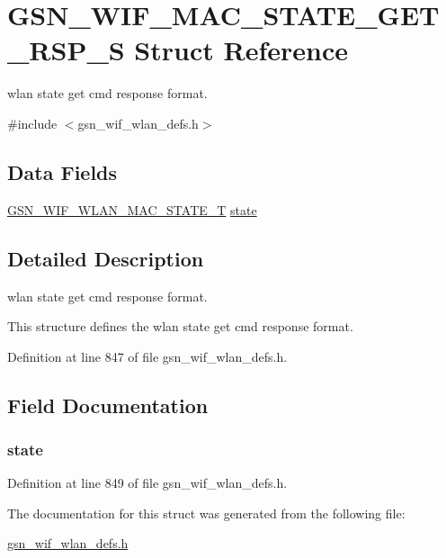 \hypertarget{a00341}{
\section{GSN\_\-WIF\_\-MAC\_\-STATE\_\-GET\_\-RSP\_\-S Struct Reference}
\label{a00341}
}


wlan state get cmd response format.  




{\ttfamily \#include $<$gsn\_\-wif\_\-wlan\_\-defs.h$>$}

\subsection*{Data Fields}
\begin{DoxyCompactItemize}
\item 
\hyperlink{a00677_gabb160daeefaad3c313cfd17480013311}{GSN\_\-WIF\_\-WLAN\_\-MAC\_\-STATE\_\-T} \hyperlink{a00341_add4967e9dd33e53ec7b947ff427ebc0b}{state}
\end{DoxyCompactItemize}


\subsection{Detailed Description}
wlan state get cmd response format. 

This structure defines the wlan state get cmd response format. 

Definition at line 847 of file gsn\_\-wif\_\-wlan\_\-defs.h.



\subsection{Field Documentation}
\hypertarget{a00341_add4967e9dd33e53ec7b947ff427ebc0b}{
\subsubsection[{state}]{ {\bf state}}}
\label{a00341_add4967e9dd33e53ec7b947ff427ebc0b}


Definition at line 849 of file gsn\_\-wif\_\-wlan\_\-defs.h.



The documentation for this struct was generated from the following file:\begin{DoxyCompactItemize}
\item 
\hyperlink{a00613}{gsn\_\-wif\_\-wlan\_\-defs.h}\end{DoxyCompactItemize}
